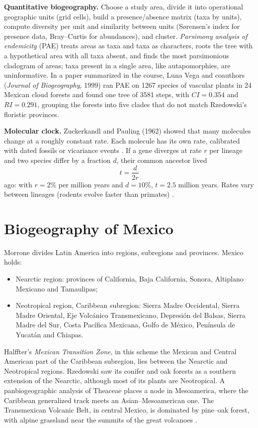\textbf{Quantitative biogeography.}
Choose a study area, divide it into
operational geographic units (grid cells),
build a presence/absence matrix (taxa by
units), compute diversity per unit and
similarity between units (S{\o}rensen's
index for presence data, Bray--Curtis for
abundances), and cluster.
\emph{Parsimony analysis of endemicity}
(PAE) treats areas as taxa and taxa as
characters, roots the tree with a
hypothetical area with all taxa absent,
and finds the most parsimonious cladogram
of areas; taxa present in a single area,
like autapomorphies, are uninformative. In
a paper summarized in the course, Luna
Vega and coauthors (\emph{Journal of
Biogeography}, 1999) ran PAE on 1267
species of vascular plants in 24 Mexican
cloud forests and found one tree of 3581
steps, with $CI = 0.354$ and
$RI = 0.291$, grouping the forests into
five clades that do not match Rzedowski's
floristic provinces.

\textbf{Molecular clock.} Zuckerkandl and
Pauling (1962) showed that many molecules
change at a roughly constant rate. Each
molecule has its own rate, calibrated
with dated fossils or vicariance events
\cite[Chapter 2]{mayr2002evolution}. If a
gene diverges at rate $r$ per lineage and
two species differ by a fraction $d$, their
common ancestor lived
$$
t = \frac{d}{2r}
$$
ago: with $r = 2\%$ per million years and
$d = 10\%$, $t = 2.5$ million years.
Rates vary between lineages (rodents
evolve faster than primates)
\cite[Chapter 10]{mayr2002evolution}.

\section{Biogeography of Mexico}
\label{section-mexico}

Morrone divides Latin America into
regions, subregions and provinces. Mexico
holds:
\begin{itemize}
\item Nearctic region: provinces of
California, Baja California, Sonora,
Altiplano Mexicano and Tamaulipas;
\item Neotropical region, Caribbean
subregion: Sierra Madre Occidental,
Sierra Madre Oriental, Eje Volc\'anico
Transmexicano, Depresi\'on del Balsas,
Sierra Madre del Sur, Costa Pac\'ifica
Mexicana, Golfo de M\'exico, Pen\'insula
de Yucat\'an and Chiapas.
\end{itemize}
Halffter's \emph{Mexican Transition Zone},
in this scheme the Mexican and Central
American part of the Caribbean subregion,
lies between the Nearctic and Neotropical
regions. Rzedowski saw its conifer and oak
forests as a southern extension of the
Nearctic, although most of its plants are
Neotropical. A panbiogeographic analysis
of Theaceae places a node in Mesoamerica,
where the Caribbean generalized track
meets an Asian--Mesoamerican one. The
Transmexican Volcanic Belt, in central
Mexico, is dominated by pine--oak forest,
with alpine grassland near the summits of
the great volcanoes
\cite{morrone2001biogeografia}.

